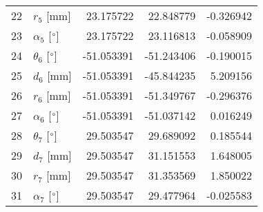 \documentclass{standalone}%
\begin{document}
\begin{tabular}{llrrr}
22 &              $r_{5}$ [mm] &  23.175722 &  22.848779 &  -0.326942 \\
23 &  $\alpha_{5}$ [$\degree$] &  23.175722 &  23.116813 &  -0.058909 \\
24 &  $\theta_{6}$ [$\degree$] & -51.053391 & -51.243406 &  -0.190015 \\
25 &              $d_{6}$ [mm] & -51.053391 & -45.844235 &   5.209156 \\
26 &              $r_{6}$ [mm] & -51.053391 & -51.349767 &  -0.296376 \\
27 &  $\alpha_{6}$ [$\degree$] & -51.053391 & -51.037142 &   0.016249 \\
28 &  $\theta_{7}$ [$\degree$] &  29.503547 &  29.689092 &   0.185544 \\
29 &              $d_{7}$ [mm] &  29.503547 &  31.151553 &   1.648005 \\
30 &              $r_{7}$ [mm] &  29.503547 &  31.353569 &   1.850022 \\
31 &  $\alpha_{7}$ [$\degree$] &  29.503547 &  29.477964 &  -0.025583 \\
\bottomrule
\end{tabular}
%
\end{document}
